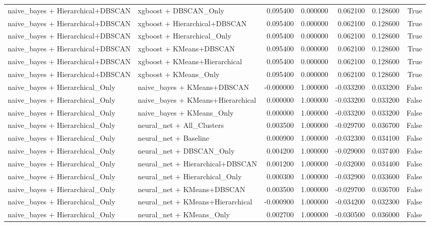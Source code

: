 \begin{tabular}{llrrrrr}
naive_bayes + Hierarchical+DBSCAN & xgboost + DBSCAN_Only & 0.095400 & 0.000000 & 0.062100 & 0.128600 & True \\
naive_bayes + Hierarchical+DBSCAN & xgboost + Hierarchical+DBSCAN & 0.095400 & 0.000000 & 0.062100 & 0.128600 & True \\
naive_bayes + Hierarchical+DBSCAN & xgboost + Hierarchical_Only & 0.095400 & 0.000000 & 0.062100 & 0.128600 & True \\
naive_bayes + Hierarchical+DBSCAN & xgboost + KMeans+DBSCAN & 0.095400 & 0.000000 & 0.062100 & 0.128600 & True \\
naive_bayes + Hierarchical+DBSCAN & xgboost + KMeans+Hierarchical & 0.095400 & 0.000000 & 0.062100 & 0.128600 & True \\
naive_bayes + Hierarchical+DBSCAN & xgboost + KMeans_Only & 0.095400 & 0.000000 & 0.062100 & 0.128600 & True \\
naive_bayes + Hierarchical_Only & naive_bayes + KMeans+DBSCAN & -0.000000 & 1.000000 & -0.033200 & 0.033200 & False \\
naive_bayes + Hierarchical_Only & naive_bayes + KMeans+Hierarchical & 0.000000 & 1.000000 & -0.033200 & 0.033200 & False \\
naive_bayes + Hierarchical_Only & naive_bayes + KMeans_Only & 0.000000 & 1.000000 & -0.033200 & 0.033200 & False \\
naive_bayes + Hierarchical_Only & neural_net + All_Clusters & 0.003500 & 1.000000 & -0.029700 & 0.036700 & False \\
naive_bayes + Hierarchical_Only & neural_net + Baseline & 0.000900 & 1.000000 & -0.032300 & 0.034100 & False \\
naive_bayes + Hierarchical_Only & neural_net + DBSCAN_Only & 0.004200 & 1.000000 & -0.029000 & 0.037400 & False \\
naive_bayes + Hierarchical_Only & neural_net + Hierarchical+DBSCAN & 0.001200 & 1.000000 & -0.032000 & 0.034400 & False \\
naive_bayes + Hierarchical_Only & neural_net + Hierarchical_Only & 0.000300 & 1.000000 & -0.032900 & 0.033600 & False \\
naive_bayes + Hierarchical_Only & neural_net + KMeans+DBSCAN & 0.003500 & 1.000000 & -0.029700 & 0.036700 & False \\
naive_bayes + Hierarchical_Only & neural_net + KMeans+Hierarchical & -0.000900 & 1.000000 & -0.034200 & 0.032300 & False \\
naive_bayes + Hierarchical_Only & neural_net + KMeans_Only & 0.002700 & 1.000000 & -0.030500 & 0.036000 & False \\

\end{tabular}
